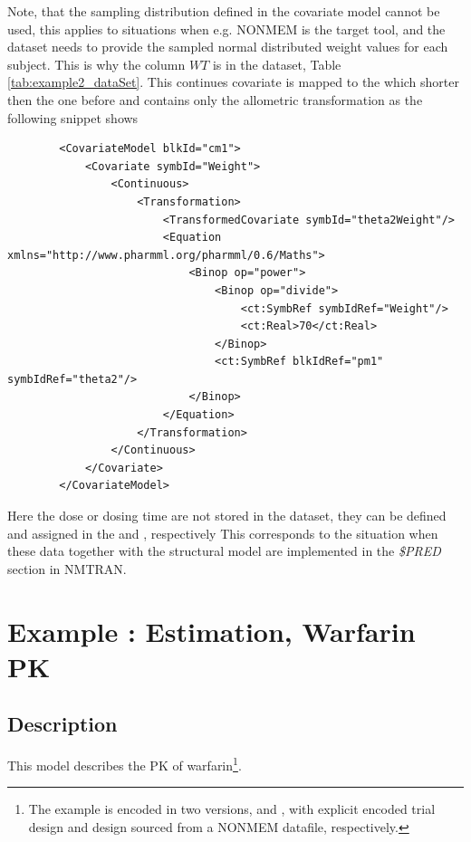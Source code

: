 Note, that the sampling distribution defined in the covariate model
cannot be used, this applies to situations when e.g. NONMEM is the target tool, 
and the dataset needs to provide the sampled normal distributed weight values for each 
subject. This is why the column $WT$ is in the dataset, Table \ref{tab:example2_dataSet}. 
This continues covariate is mapped to the 
 which shorter then the one before and contains 
only the allometric transformation as the following snippet shows
\lstset{language=XML}
\begin{lstlisting}
        <CovariateModel blkId="cm1">
            <Covariate symbId="Weight">
                <Continuous>
                    <Transformation>
                        <TransformedCovariate symbId="theta2Weight"/>
                        <Equation xmlns="http://www.pharmml.org/pharmml/0.6/Maths">
                            <Binop op="power">
                                <Binop op="divide">
                                    <ct:SymbRef symbIdRef="Weight"/>
                                    <ct:Real>70</ct:Real>
                                </Binop>
                                <ct:SymbRef blkIdRef="pm1" symbIdRef="theta2"/>
                            </Binop>
                        </Equation>
                    </Transformation>
                </Continuous>
            </Covariate>
        </CovariateModel>
\end{lstlisting}

Here the dose or dosing time are not stored in the dataset, they can be defined
and assigned in the  and , respectively
This corresponds to the situation when these data together with the structural model
are implemented in the \emph{\$PRED} section in NMTRAN.


\section{Example \theexamples: Estimation, Warfarin PK}
\label{sec:eg3}

\subsection{Description}

This model describes the PK of warfarin\footnote{The example is encoded in two versions,  
 and , with explicit encoded trial 
design and design sourced from a NONMEM datafile, respectively.}.
 
